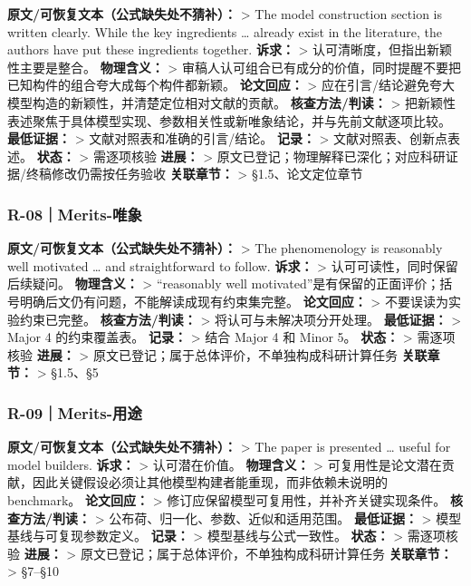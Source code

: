 \documentclass[
]{article}
\begin{document}
\textbf{原文/可恢复文本（公式缺失处不猜补）：} \textgreater{} The model
construction section is written clearly. While the key ingredients
\ldots{} already exist in the literature, the authors have put these
ingredients together. \textbf{诉求：} \textgreater{}
认可清晰度，但指出新颖性主要是整合。 \textbf{物理含义：} \textgreater{}
审稿人认可组合已有成分的价值，同时提醒不要把已知构件的组合夸大成每个构件都新颖。
\textbf{论文回应：} \textgreater{}
应在引言/结论避免夸大模型构造的新颖性，并清楚定位相对文献的贡献。
\textbf{核查方法/判读：} \textgreater{}
把新颖性表述聚焦于具体模型实现、参数相关性或新唯象结论，并与先前文献逐项比较。
\textbf{最低证据：} \textgreater{} 文献对照表和准确的引言/结论。
\textbf{记录：} \textgreater{} 文献对照表、创新点表述。 \textbf{状态：}
\textgreater{} 需逐项核验 \textbf{进展：} \textgreater{}
原文已登记；物理解释已深化；对应科研证据/终稿修改仍需按任务验收
\textbf{关联章节：} \textgreater{} §1.5、论文定位章节

\subsubsection{R-08｜Merits-唯象}\label{r-08merits-ux552fux8c61}

\textbf{原文/可恢复文本（公式缺失处不猜补）：} \textgreater{} The
phenomenology is reasonably well motivated \ldots{} and straightforward
to follow. \textbf{诉求：} \textgreater{} 认可可读性，同时保留后续疑问。
\textbf{物理含义：} \textgreater{} ``reasonably well
motivated''是有保留的正面评价；括号明确后文仍有问题，不能解读成现有约束集完整。
\textbf{论文回应：} \textgreater{} 不要误读为实验约束已完整。
\textbf{核查方法/判读：} \textgreater{} 将认可与未解决项分开处理。
\textbf{最低证据：} \textgreater{} Major 4 的约束覆盖表。
\textbf{记录：} \textgreater{} 结合 Major 4 和 Minor 5。 \textbf{状态：}
\textgreater{} 需逐项核验 \textbf{进展：} \textgreater{}
原文已登记；属于总体评价，不单独构成科研计算任务 \textbf{关联章节：}
\textgreater{} §1.5、§5

\subsubsection{R-09｜Merits-用途}\label{r-09merits-ux7528ux9014}

\textbf{原文/可恢复文本（公式缺失处不猜补）：} \textgreater{} The paper
is presented \ldots{} useful for model builders. \textbf{诉求：}
\textgreater{} 认可潜在价值。 \textbf{物理含义：} \textgreater{}
可复用性是论文潜在贡献，因此关键假设必须让其他模型构建者能重现，而非依赖未说明的
benchmark。 \textbf{论文回应：} \textgreater{}
修订应保留模型可复用性，并补齐关键实现条件。 \textbf{核查方法/判读：}
\textgreater{} 公布荷、归一化、参数、近似和适用范围。
\textbf{最低证据：} \textgreater{} 模型基线与可复现参数定义。
\textbf{记录：} \textgreater{} 模型基线与公式一致性。 \textbf{状态：}
\textgreater{} 需逐项核验 \textbf{进展：} \textgreater{}
原文已登记；属于总体评价，不单独构成科研计算任务 \textbf{关联章节：}
\textgreater{} §7--§10
\end{document}
